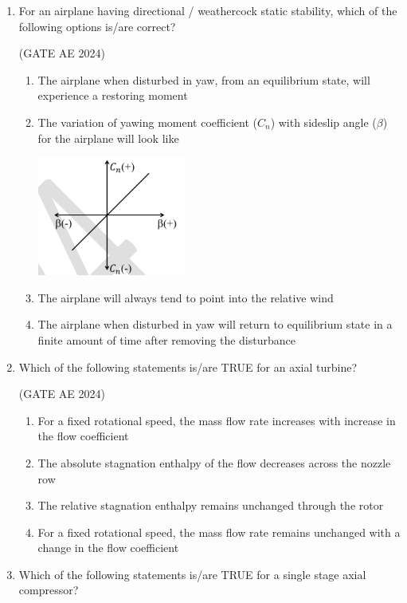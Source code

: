 \documentclass[journal,12pt,onecolumn]{IEEEtran}
\theoremstyle{remark}
\begin{document}
\begin{flushleft}
\begin{enumerate}
\item  For an airplane having directional / weathercock static stability, which of the following options is/are correct?  

\hfill (GATE AE 2024)

\begin{enumerate}
      \item The airplane when disturbed in yaw, from an equilibrium state, will experience a restoring moment  
      \item The variation of yawing moment coefficient ($C_n$) with sideslip angle ($\beta$) for the airplane will look like   
      
      \hfill\includegraphics[width=0.25\columnwidth]{figs/48.png}
      
      \item The airplane will always tend to point into the relative wind  
      \item The airplane when disturbed in yaw will return to equilibrium state in a finite amount of time after removing the disturbance  
\end{enumerate}


\item  Which of the following statements is/are TRUE for an axial turbine?  

\hfill (GATE AE 2024)

\begin{enumerate}
    \item For a fixed rotational speed, the mass flow rate increases with increase in the flow coefficient  
    \item The absolute stagnation enthalpy of the flow decreases across the nozzle row  
    \item The relative stagnation enthalpy remains unchanged through the rotor  
    \item For a fixed rotational speed, the mass flow rate remains unchanged with a change in the flow coefficient  
\end{enumerate}

\item Which of the following statements is/are TRUE for a single stage axial compressor?  


\end{enumerate}
\end{flushleft}
\end{document}
